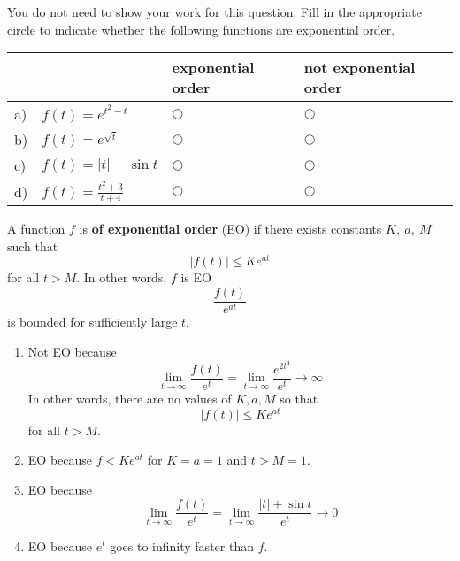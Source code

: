 \ifnum {}
\question[2] You do not need to show your work for this question. Fill in the appropriate circle to indicate whether the following functions are exponential order. 
\vspace{-0.2cm}
\setlength{\extrarowheight}{0.10cm}
\begin{center}
\hspace{-.9cm}\begin{tabular}{ p{0.20cm} p{4cm} p{3.5cm} p{4cm} }
    & & exponential order &  not exponential order  \\[4pt] \hline 
    a) & $f(t) = e^{t^2-t}$  & $\bigcirc$  & $\bigcirc$ \\[4pt] 
    b) & $f(t) = e^{\sqrt t}$  & $\bigcirc$  & $\bigcirc$ \\[4pt] 
    c) & $f(t) = |t|+\sin t$ & $\bigcirc$  & $\bigcirc$ \\[4pt]  
    d) & $\displaystyle f(t) = \frac{t^2+3}{t+4}$  & $\bigcirc$  & $\bigcirc$ \\[6pt]  

    \hline
\end{tabular}
\end{center}
\setlength{\extrarowheight}{0.0cm}
\ifnum {} {\color{DarkBlue} A function 
$f$ is \textbf{of exponential order} (EO) if there exists constants $K, \ a, \ M$ such that $$  |f(t)| \leq Ke^{at}  $$ for all $t > M$. In other words, $f$ is EO $$ \frac{f(t)}{e^{at}}  $$ is bounded for sufficiently large $t$.
\begin{enumerate}[label=(\alph*)]
    \item Not EO because 
    $$\lim_{t\to \infty}\frac{f(t)}{e^t} = \lim_{t\to \infty}\frac{e^{2t^4}}{e^t} \to \infty$$ In other words, there are no values of $K,a,M$ so that $$  |f(t)| \leq Ke^{at}  $$ for all $t > M$.
    \item EO because $f < Ke^{at}$ for $K=a=1$ and $t > M=1$. 
    \item EO because $$\lim_{t\to \infty}\frac{f(t)}{e^t} = \lim_{t\to \infty}\frac{|t| + \sin t}{e^t} \to 0$$    
    \item EO because $e^t$ goes to infinity faster than $f$. 
\end{enumerate}
}
\fi
\vspace{-6pt} 
\fi 
